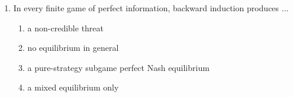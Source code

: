 \documentclass[11pt]{article}
\begin{document}
\begin{enumerate}[itemsep=6pt]
\begin{enumerate}
    \item the folk theorem
    \item Pareto efficiency
    \item sequential rationality
  \end{enumerate}
  \item In every finite game of perfect information, backward induction produces ...
  \begin{enumerate}
    \item a non-credible threat
    \item no equilibrium in general
    \item a pure-strategy subgame perfect Nash equilibrium
    \item a mixed equilibrium only
  \end{enumerate}
\end{enumerate}
\end{document}
